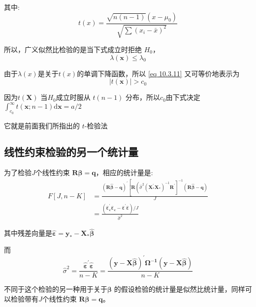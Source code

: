 \begin{myexample}
     其中:
     \begin{equation}
         t(x)=\frac{\sqrt{n(n-1)}\left(x-\mu_{0}\right)}{\sqrt{\sum\left(x_{i}-\bar{x}\right)^{2}}} 
     \end{equation}

     所以，广义似然比检验的是当下式成立时拒绝 $ H_0 $， 
     \begin{equation}
        \lambda(\boldsymbol{x}) \leq \lambda_{0}
        \label{eq 10.3.11}
     \end{equation}
     
     由于$ \lambda(x) $是关于$ t(x) $的单调下降函数，所以 \ref{eq 10.3.11} 又可等价地表示为
     \begin{equation}
        |t(\boldsymbol{x})|>c_{0}
     \end{equation}

     因为$ t(\boldsymbol{X}) $ 当$ H_{0} $成立时服从 $ t(n − 1) $ 分布，所以$ c_0 $由下式决定$ \int_{c_{0}}^{\infty} t(\boldsymbol{x} ; n-1) \mathrm{d} \boldsymbol{x}=a / 2 $

     它就是前面我们所指出的 $ t $-检验法
\end{myexample}
    
\subsection{线性约束检验的另一个统计量}

为了检验$ J $个线性约束 $ \boldsymbol{R \beta  = q}$，相应的统计量是:
$$ \begin{aligned}
    F[J, n-K] &=\frac{(\boldsymbol{R \hat{\beta}-q})^{\prime}
    \left[\boldsymbol{R} \left(\hat{\sigma}^{2}\left( \boldsymbol{X_{*}^{\prime} X_{*}} \right)^{-1} \boldsymbol{R^{\prime}} \right]^{-1}
    (\boldsymbol{ R \hat{\beta}-q})\right.}{J} \\
    &= \frac{\left( \boldsymbol{\hat{\varepsilon}_{c}^{\prime} \hat{\varepsilon}_{c}-
    \hat{\varepsilon}^{\prime} \hat{\varepsilon}} \right) / J}{\hat{\sigma}^{2}}
    \end{aligned} $$

    其中残差向量是$ \boldsymbol{ \hat{\varepsilon} = y_{*}-X_{*} \hat{\beta} } $

    而
    $$ \hat{\sigma}^{2} = \frac{ \boldsymbol{ \hat{\varepsilon}^{\prime} \hat{\varepsilon}} }{n-K}=
       \frac{( \boldsymbol{y-X \hat{\beta}} )^{\prime} \boldsymbol{\Omega^{-1}(y-X \hat{\beta})}}{n-K} $$

    不同于这个检验的另一种用于关于$ \boldsymbol{\beta}  $ 的假设检验的统计量是似然比统计量，同样可以检验带有$ J $个线性约束 $ \boldsymbol{R \beta  = q} $。


